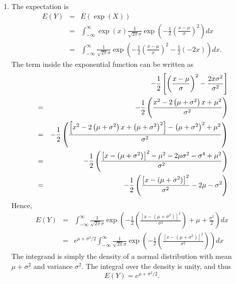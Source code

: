 \documentclass{article}
\begin{document}
\begin{solution}
\begin{enumerate}
\item The expectation is%
\begin{eqnarray*}
E(Y) &=&E\left( \exp \left( X\right) \right)  \\
&=&\int_{-\infty }^{\infty }\exp \left( x\right) \frac{1}{\sqrt{2\pi }\sigma
}\exp \left( -\frac{1}{2}\left( \frac{x-\mu }{\sigma }\right) ^{2}\right) dx
\\
&=&\int_{-\infty }^{\infty }\frac{1}{\sqrt{2\pi }\sigma }\exp \left( -\frac{1%
}{2}\left( \frac{x-\mu }{\sigma }\right) ^{2}-\frac{1}{2}\left( -2x\right)
\right) dx.
\end{eqnarray*}%
The term inside the exponential function can be written as%
\begin{eqnarray*}
&&-\frac{1}{2}\left[ \left( \frac{x-\mu }{\sigma }\right) ^{2}-\frac{%
2x\sigma ^{2}}{\sigma ^{2}}\right]  \\
&=&-\frac{1}{2}\left( \frac{x^{2}-2\left( \mu +\sigma ^{2}\right) x+\mu ^{2}%
}{\sigma ^{2}}\right)  \\
&=&-\frac{1}{2}\left( \frac{\left[ x^{2}-2\left( \mu +\sigma ^{2}\right)
x+\left( \mu +\sigma ^{2}\right) ^{2}\right] -\left( \mu +\sigma ^{2}\right)
^{2}+\mu ^{2}}{\sigma ^{2}}\right)  \\
&=&-\frac{1}{2}\left( \frac{\left[ x-\left( \mu +\sigma ^{2}\right)
\right]^2 -\mu^2 -2\mu \sigma ^{2}-\sigma ^{4}+\mu^2}{%
\sigma ^{2}}\right)  \\
&=&-\frac{1}{2}\left(\frac{\left[x-(\mu+\sigma^2)\right]^2}{\sigma^2} - 2\mu - \sigma^2 \right)
\end{eqnarray*}%
Hence,%
\begin{eqnarray*}
E(Y) &=&\int_{-\infty }^{\infty }\frac{1}{\sqrt{2\pi }\sigma }\exp \left( -%
\frac{1}{2}\left(\frac{\left[x-(\mu+\sigma^2)\right]^2}{\sigma^2}\right) + \mu +\frac{\sigma^2}{2} \right) dx \\
&=&e^{\mu +\sigma ^{2}/2}\int_{-\infty }^{\infty }\frac{1}{\sqrt{2\pi }%
\sigma }\exp \left( -\frac{1}{2}\left(\frac{\left[x-(\mu+\sigma^2)\right]^2}{\sigma^2}\right)\right)dx
\end{eqnarray*}%
The integrand is simply the density of a normal distribution with mean
$\mu +\sigma ^{2}$ and variance $\sigma ^{2}$. The integral over the
density is unity, and thus%
\begin{equation*}
E(Y)=e^{\mu +\sigma ^{2}/2}.
\end{equation*}


\end{enumerate}
\end{solution}
\end{document}
